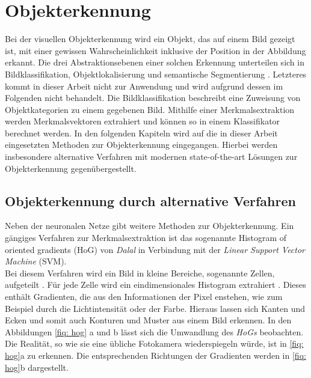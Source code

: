 	\section{Objekterkennung}
	\label{sec: Objekterkennung}
	Bei der visuellen Objekterkennung wird ein Objekt, das auf einem Bild gezeigt ist, mit einer gewissen Wahrscheinlichkeit inklusive der Position in der Abbildung erkannt. Die drei Abstraktionsebenen einer solchen Erkennung unterteilen sich in Bildklassifikation, Objektlokalisierung und semantische Segmentierung \cite{bildundobjekt}. Letzteres kommt in dieser Arbeit nicht zur Anwendung und wird aufgrund dessen im Folgenden nicht behandelt. Die Bildklassifikation beschreibt eine Zuweisung von Objektkategorien zu einem gegebenen Bild. Mithilfe einer Merkmalsextraktion werden Merkmalsvektoren extrahiert und können so in einem Klassifikator berechnet werden. In den folgenden Kapiteln wird auf die in dieser Arbeit eingesetzten Methoden zur Objekterkennung eingegangen. Hierbei werden insbesondere alternative Verfahren mit modernen state-of-the-art Lösungen zur Objekterkennung gegenübergestellt.  
	
	
		\subsection{Objekterkennung durch alternative Verfahren}
		\label{subsec: Objekterkennung durch alternative Verfahren}	
		
		
		Neben der neuronalen Netze gibt weitere Methoden zur Objekterkennung. Ein gängiges Verfahren zur Merkmalsextraktion ist das sogenannte Histogram of oriented gradients (HoG) von \textit{Dalal} in Verbindung mit der \textit{Linear Support Vector Machine} (SVM).\\
		
		Bei diesem Verfahren wird ein Bild in kleine Bereiche, sogenannte Zellen, aufgeteilt \cite{hogsvm}. Für jede Zelle wird ein eindimensionales Histogram extrahiert \cite{hogsvm}. Dieses enthält Gradienten, die aus den Informationen der Pixel enstehen, wie zum Beispiel durch die Lichtintensität oder der Farbe. Hieraus lassen sich Kanten und Ecken und somit auch Konturen und Muster aus einem Bild erkennen. In den Abbildungen \ref{fiq: hog} a und b lässt sich die Umwandlung des \textit{HoGs} beobachten. Die Realität, so wie sie eine übliche Fotokamera wiederspiegeln würde, ist in \ref{fiq: hog}a zu erkennen. Die entsprechenden Richtungen der Gradienten werden in \ref{fiq: hog}b dargestellt. \\
		

